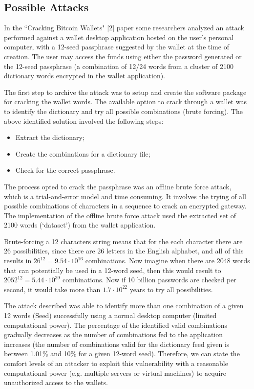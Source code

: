 \documentclass{article}
\begin{document}
\subsection*{Possible Attacks}
In the ``Cracking Bitcoin Wallets" [2] paper some researchers analyzed an attack performed against a wallet desktop application hosted on the user’s personal computer, with a 12-seed passphrase suggested by the wallet at the time of creation. The user may access the funds using either the password generated or the 12-seed passphrase (a combination of 12/24 words from a cluster of 2100 dictionary words encrypted in the wallet application).\par\noindent
The first step to archive the attack was to setup and create the software package for cracking the wallet words. The available option to crack through a wallet was to identify the dictionary and try all possible combinations (brute forcing). The above identified solution involved the following steps:
\begin{itemize}
    \item Extract the dictionary;
    \item Create the combinations for a dictionary file;
    \item Check for the correct passphrase.
\end{itemize}
The process opted to crack the passphrase was an offline brute force attack, which is a trial-and-error model and time consuming. It involves the trying of all possible combinations of characters in a sequence to crack an encrypted gateway. The implementation of the offline brute force attack used the extracted set of 2100 words (‘dataset’) from the wallet application.\par
\noindent Brute-forcing a 12 characters string means that for the each character there are 26 possibilities, since there are 26 letters in the English alphabet, and all of this results in \(26^{12} = 9.54 \cdot 10^{16}\) combinations. Now imagine when there are 2048 words that can potentially be used in a 12-word seed, then this would result to \(2052^{12} = 5.44 \cdot 10^{39}\) combinations. Now if 10 billion passwords are checked per second, it would take more than \(1.7 \cdot 10^{22}\) years to try all possibilities.\par\noindent
The attack described was able to identify more than one combination of a given 12 words (Seed) successfully using a normal desktop computer (limited computational power). The percentage of the identified valid combinations gradually decreases as the number of combinations fed to the application increases (the number of combinations valid for the dictionary feed given is between 1.01\% and 10\% for a given 12-word seed). Therefore, we can state the comfort levels of an attacker to exploit this vulnerability with a reasonable computational power (e.g. multiple servers or virtual machines) to acquire unauthorized access to the wallets.
\clearpage
\end{document}
